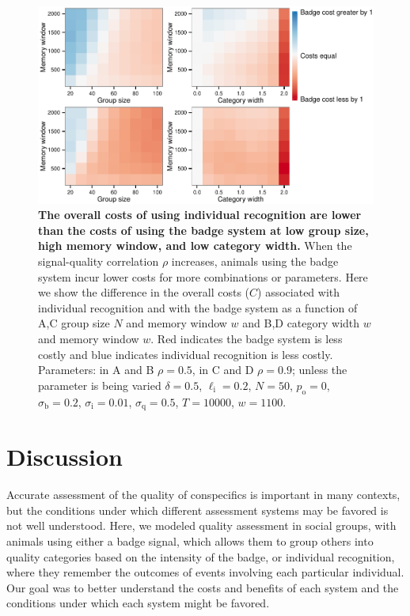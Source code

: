 \begin{figure}
\includegraphics[width=6.85in]{figures/cost_comparisons.pdf}
\caption{\sffamily\small\textbf{The overall costs of using individual recognition are lower than the costs of using the badge system at low group size, high memory window, and low category width.} When the signal-quality correlation $\rho$ increases, animals using the badge system incur lower costs for more combinations or parameters. Here we show the difference in the overall costs ($C$) associated with individual recognition and with the badge system as a function of A,C group size $N$ and memory window $w$ and B,D category width $w$ and memory window $w$. Red indicates the badge system is less costly and blue indicates individual recognition is less costly. Parameters: in A and B $\rho=0.5$, in C and D $\rho=0.9$; unless the parameter is being varied $\delta = 0.5$, $\ell_\text{i}=0.2$, $N=50$, $p_\text{o}=0$, $\sigma_\text{b}=0.2$, $\sigma_\text{i}=0.01$, $\sigma_\text{q}=0.5$, $T=10000$, $w=1100$.}
\label{comparison}
\end{figure}

\section*{Discussion}

Accurate assessment of the quality of conspecifics is important in many contexts, but the conditions under which different assessment systems may be favored is not well understood. Here, we modeled quality assessment in social groups, with animals using either a badge signal, which allows them to group others into quality categories based on the intensity of the badge, or individual recognition, where they remember the outcomes of events involving each particular individual. Our goal was to better understand the costs and benefits of each system and the conditions under which each system might be favored. 

